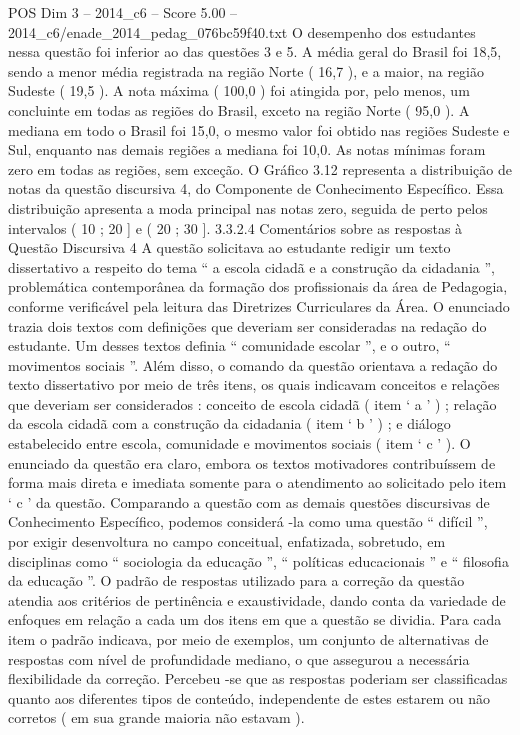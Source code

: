 \begin{textsample}{POS Dim 3 – 2014\_c6 – Score 5.00 – 2014\_c6/enade\_2014\_pedag\_076bc59f40.txt}
O desempenho dos estudantes nessa questão foi inferior ao das questões 3 e 5.
A média geral do Brasil foi 18,5, sendo a menor média registrada na região Norte ( 16,7 ), e a maior, na região Sudeste ( 19,5 ).
A nota máxima ( 100,0 ) foi atingida por, pelo menos, um concluinte em todas as regiões do Brasil, exceto na região Norte ( 95,0 ).
A mediana em todo o Brasil foi 15,0, o mesmo valor foi obtido nas regiões Sudeste e Sul, enquanto nas demais regiões a mediana foi 10,0.
As notas mínimas foram zero em todas as regiões, sem exceção.
O Gráfico 3.12 representa a distribuição de notas da questão discursiva 4, do Componente de Conhecimento Específico.
Essa distribuição apresenta a moda principal nas notas zero, seguida de perto pelos intervalos ( 10 ; 20 ] e ( 20 ; 30 ]. 3.3.2.4 Comentários sobre as respostas à Questão Discursiva 4 A questão solicitava ao estudante redigir um texto dissertativo a respeito do tema “ a escola cidadã e a construção da cidadania ”, problemática contemporânea da formação dos profissionais da área de Pedagogia, conforme verificável pela leitura das Diretrizes Curriculares da Área.
O enunciado trazia dois textos com definições que deveriam ser consideradas na redação do estudante.
Um desses textos definia “ comunidade escolar ”, e o outro, “ movimentos sociais ”.
Além disso, o comando da questão orientava a redação do texto dissertativo por meio de três itens, os quais indicavam conceitos e relações que deveriam ser considerados : conceito de escola cidadã ( item ‘ a ’ ) ; relação da escola cidadã com a construção da cidadania ( item ‘ b ’ ) ; e diálogo estabelecido entre escola, comunidade e movimentos sociais ( item ‘ c ’ ).
O enunciado da questão era claro, embora os textos motivadores contribuíssem de forma mais direta e imediata somente para o atendimento ao solicitado pelo item ‘ c ’ da questão.
Comparando a questão com as demais questões discursivas de Conhecimento Específico, podemos considerá -la como uma questão “ difícil ”, por exigir desenvoltura no campo conceitual, enfatizada, sobretudo, em disciplinas como “ sociologia da educação ”, “ políticas educacionais ” e “ filosofia da educação ”.
O padrão de respostas utilizado para a correção da questão atendia aos critérios de pertinência e exaustividade, dando conta da variedade de enfoques em relação a cada um dos itens em que a questão se dividia.
Para cada item o padrão indicava, por meio de exemplos, um conjunto de alternativas de respostas com nível de profundidade mediano, o que assegurou a necessária flexibilidade da correção.
Percebeu -se que as respostas poderiam ser classificadas quanto aos diferentes tipos de conteúdo, independente de estes estarem ou não corretos ( em sua grande maioria não estavam ).

\end{textsample}
